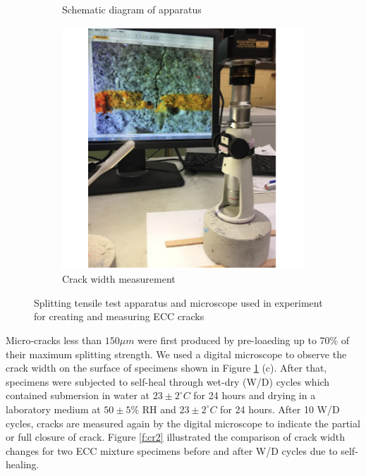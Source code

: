 \documentclass[11pt]{article}
\begin{document}
\begin{figure}[!h]
\begin{subfigure}{0.31\textwidth}
		\caption{Schematic diagram of apparatus}
		\end{subfigure}	
	\hspace{-0.10em}
		\begin{subfigure}{0.31\textwidth}
		\centering
		\includegraphics[width = \linewidth]{CR3}
		\caption{Crack width measurement}
		\end{subfigure}
		\caption{Splitting tensile test apparatus and microscope used in experiment for creating and measuring ECC cracks}\label{f:cr1}
	\end{figure}
	
	Micro-cracks less than $150 \mu m$ were first produced by pre-loaeding up to 70\% of their maximum splitting strength. We used a digital microscope to observe the crack width on the surface of specimens shown in Figure \ref{f:cr1} (c). After that, specimens were subjected to self-heal through wet-dry (W/D) cycles which contained submersion in water at $23 \pm 2^\circ C$ for 24 hours and drying in a laboratory medium at $50 \pm 5\%$ RH and $23 \pm 2^\circ C$ for 24 hours. After 10 W/D cycles, cracks are measured again by the digital microscope to indicate the partial or full closure of crack. Figure \ref{f:cr2} illustrated the comparison of crack width changes for two ECC mixture specimens before and after W/D cycles due to self-healing. 
\end{document}
